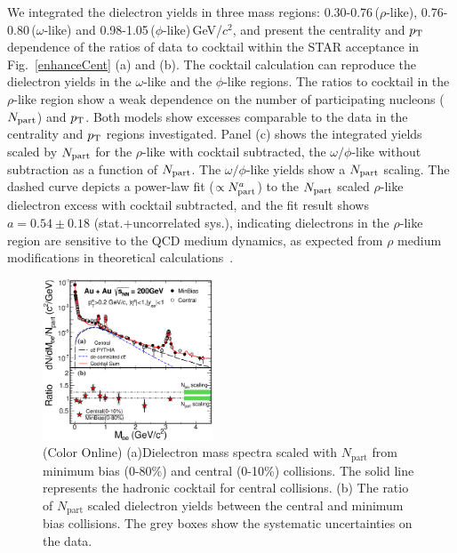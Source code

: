 \documentclass[twocolumn,showpacs,amsmath,amssymb,superscriptaddress,nofootinbib]{revtex4-1}
\newcommand{ \pT }{$p_{\rm T}$ }
\begin{document}
We integrated the dielectron yields in three mass regions: 0.30-0.76\,($\rho$-like),
0.76-0.80\,($\omega$-like) and 0.98-1.05\,($\phi$-like)\,GeV/$c^2$, and present the centrality and \pT dependence of the ratios of data to cocktail within the STAR acceptance in Fig.~\ref{enhanceCent} (a) and (b).
The cocktail calculation can reproduce the dielectron yields in the $\omega$-like and the $\phi$-like regions.
The ratios to cocktail in the $\rho$-like region show a weak dependence on the number of participating nucleons ($N_{\rm part}$) and $p_{\rm T}$. Both models show excesses comparable to the data in the centrality and $p_{\rm T}$ regions investigated.
Panel (c) shows the integrated yields scaled by $N_{\rm part}$ for the $\rho$-like with cocktail subtracted, the $\omega/\phi$-like without subtraction as a function of $N_{\rm part}$. The $\omega/\phi$-like yields show a $N_{\rm part}$ scaling. The dashed curve depicts a power-law fit ($\propto N_{\rm part}^a$) to the $N_{\rm part}$ scaled $\rho$-like dielectron excess with cocktail subtracted, and the fit result shows $a=0.54\pm0.18$ (stat.+uncorrelated sys.), indicating dielectrons in the $\rho$-like region are sensitive to the QCD medium dynamics, as expected from $\rho$ medium modifications in theoretical calculations~\cite{RappPriv,RhoOmega}.

\begin{figure}[h]
\centering
\includegraphics[width=0.45\textwidth] {ee200Rcp.eps}
\caption[]{(Color Online) (a)Dielectron mass spectra scaled with $N_\mathrm{part}$ from minimum bias (0-80\%) and central (0-10\%) collisions. The solid line represents the hadronic cocktail for central collisions. (b) The ratio of $N_\mathrm{part}$ scaled dielectron yields between the central and minimum bias collisions. The grey boxes show the systematic uncertainties on the data.}
\label{dielectronRcp}
\end{figure}
\end{document}

